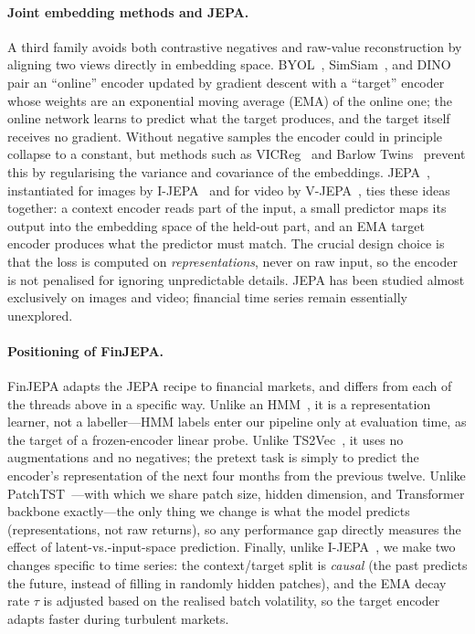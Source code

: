 \documentclass[twocolumn, 10pt]{article}
\begin{document}
\paragraph{Joint embedding methods and JEPA.}
A third family avoids both contrastive negatives and raw-value
reconstruction by aligning two views directly in embedding space.
BYOL~\cite{grill2020byol}, SimSiam~\cite{chen2021simsiam}, and
DINO~\cite{caron2021dino} pair an ``online'' encoder updated by gradient
descent with a ``target'' encoder whose weights are an exponential moving
average (EMA) of the online one; the online network learns to predict
what the target produces, and the target itself receives no gradient.
Without negative samples the encoder could in principle collapse to a
constant, but methods such as VICReg~\cite{bardes2021vicreg} and Barlow
Twins~\cite{zbontar2021barlow} prevent this by regularising the variance
and covariance of the embeddings. JEPA~\cite{lecun2022path}, instantiated
for images by I-JEPA~\cite{ijepa} and for video by
V-JEPA~\cite{bardes2024vjepa}, ties these ideas together: a context
encoder reads part of the input, a small predictor maps its output into
the embedding space of the held-out part, and an EMA target encoder
produces what the predictor must match. The crucial design choice is that
the loss is computed on \emph{representations}, never on raw input, so
the encoder is not penalised for ignoring unpredictable details. JEPA has
been studied almost exclusively on images and video; financial time
series remain essentially unexplored.

\paragraph{Positioning of FinJEPA.}
FinJEPA adapts the JEPA recipe to financial markets, and differs from
each of the threads above in a specific way. Unlike an
HMM~\cite{hamilton1989}, it is a representation learner, not a
labeller---HMM labels enter our pipeline only at evaluation time, as the
target of a frozen-encoder linear probe. Unlike
TS2Vec~\cite{yue2022ts2vec}, it uses no augmentations and no negatives;
the pretext task is simply to predict the encoder's representation of the
next four months from the previous twelve. Unlike
PatchTST~\cite{patchtst}---with which we share patch size, hidden
dimension, and Transformer backbone exactly---the only thing we change
is what the model predicts (representations, not raw returns), so any
performance gap directly measures the effect of latent-vs.-input-space
prediction. Finally, unlike I-JEPA~\cite{ijepa}, we make two changes
specific to time series: the context/target split is \emph{causal} (the
past predicts the future, instead of filling in randomly hidden patches),
and the EMA decay rate $\tau$ is adjusted based on the realised batch
volatility, so the target encoder adapts faster during turbulent markets.
\end{document}
